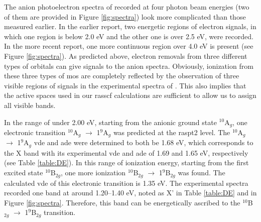 \begin{refsection}

The anion photoelectron spectra of  recorded at four photon beam energies \cite{Zhai06} (two of them are provided in Figure \ref{fig:spectra}) look more complicated than those measured earlier. \cite{Tono2003B} In the earlier report,\cite{Tono2003B} two energetic regions of electron signals, in which one region is below 2.0 eV and the other one is over 2.5 eV, were recorded. In the more recent report, one more continuous region over 4.0 eV is present (see Figure \ref{fig:spectra}). \cite{Zhai06} As predicted above, electron removals from three different types of orbitals can give signals to the anion spectra. Obviously, ionization from these three types of \acrshort{mo}s are completely reflected by the observation of three visible regions of signals in the experimental spectra of . \cite{Zhai06} This also implies that the active spaces used in our \acrshort{rasscf} calculations are sufficient to allow us to assign all visible bands.  


In the range of under 2.00 eV, starting from the anionic ground state $^{10}$A$_g$, one electronic transition $^{10}$A$_g$ $\longrightarrow$ 1$^9$A$_g$ was predicted at the \acrshort{raspt2} level. The $^{10}$A$_g$ $\longrightarrow$ 1$^9$A$_g$ \acrshort{vde} and \acrshort{ade} were determined to both be 1.68 eV, which corresponds to the X band with its experimental \acrshort{vde} and \acrshort{ade} of 1.69 and 1.65 eV, respectively (see Table \ref{table:DE}). In this range of ionization energy, starting from the first excited state $^{10}$B$_{2g}$, one more ionization $^{10}$B$_{2g}$ $\longrightarrow$ 1$^9$B$_{2g}$ was found. The calculated \acrshort{vde} of this electronic transition is 1.35 eV. The experimental spectra recorded one band at around 1.20–1.40 eV, noted as X' in Table \ref{table:DE} and in Figure \ref{fig:spectra}. Therefore, this band can be energetically ascribed to the $^{10}$B$_{2g}$ $\longrightarrow$ 1$^9$B$_{2g}$ transition. 



\end{refsection}
